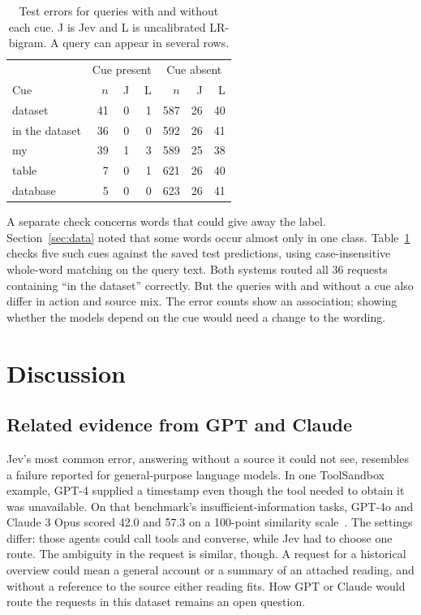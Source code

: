 \documentclass[conference]{IEEEtran}
\begin{document}
\begin{table}[tbp]
\centering\caption{Test errors for queries with and without each cue. J is Jev and L is uncalibrated LR-bigram. A query can appear in several rows.}\label{tab:cues}
\begin{tabular}{lrrrrrr}\toprule
&\multicolumn{3}{c}{Cue present}&\multicolumn{3}{c}{Cue absent}\\
Cue & \(n\) & J & L & \(n\) & J & L\\ \midrule
dataset &41&0&1&587&26&40\\
in the dataset &36&0&0&592&26&41\\
my &39&1&3&589&25&38\\
table &7&0&1&621&26&40\\
database &5&0&0&623&26&41\\ \bottomrule
\end{tabular}
\end{table}

A separate check concerns words that could give away the label. Section~\ref{sec:data} noted that some words occur almost only in one class. Table~\ref{tab:cues} checks five such cues against the saved test predictions, using case-insensitive whole-word matching on the query text. Both systems routed all 36 requests containing ``in the dataset'' correctly. But the queries with and without a cue also differ in action and source mix. The error counts show an association; showing whether the models depend on the cue would need a change to the wording.

\section{Discussion}\label{sec:discussion}

\subsection{Related evidence from GPT and Claude}
Jev's most common error, answering without a source it could not see, resembles a failure reported for general-purpose language models. In one ToolSandbox example, GPT-4 supplied a timestamp even though the tool needed to obtain it was unavailable. On that benchmark's insufficient-information tasks, GPT-4o and Claude 3 Opus scored 42.0 and 57.3 on a 100-point similarity scale~\cite{toolsandbox}. The settings differ: those agents could call tools and converse, while Jev had to choose one route. The ambiguity in the request is similar, though. A request for a historical overview could mean a general account or a summary of an attached reading, and without a reference to the source either reading fits. How GPT or Claude would route the requests in this dataset remains an open question.
\end{document}
